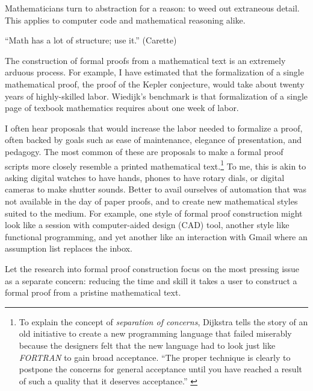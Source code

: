\documentclass{llncs}
\begin{document}
Mathematicians  turn to abstraction for a reason: to weed out
extraneous detail.  This applies to computer code and mathematical
reasoning alike.

``Math has a lot of structure; use it.'' (Carette)


The construction of formal proofs from a mathematical text is an extremely
arduous process.  For example, I have estimated that the formalization of a single
mathematical proof, the proof of the Kepler conjecture, would take about twenty
years of highly-skilled labor.  Wiedijk's benchmark is that formalization
of a single page of texbook mathematics requires about one week of labor.

I often hear proposals that would increase the labor needed to
formalize a proof, often backed by goals such as ease of maintenance,
elegance of presentation, and pedagogy.  The most common of these are
proposals to make a formal proof scripts more closely resemble a
printed mathematical text.\footnote{To explain the concept of {\it
    separation of concerns}, Dijkstra tells the story of an old
  initiative to create a new programming language that failed
  miserably because the designers felt that the new language had to
  look just like {\it FORTRAN} to gain broad acceptance. ``The proper
  technique is clearly to postpone the concerns for general acceptance
  until you have reached a result of such a quality that it deserves
  acceptance.'' \cite{XX}} %
 To me, this is
akin to asking digital watches to have hands, phones to have rotary
dials, or digital cameras to make shutter sounds.  Better to avail
ourselves of automation that was not available in the day of paper
proofs, and to create new mathematical styles suited to the medium.
For example, one style of formal proof construction might look like a
session with computer-aided design (CAD) tool, another style like
functional programming, and yet another like an interaction with Gmail
where an assumption list replaces the inbox.


Let the research into formal proof construction focus on the most
pressing issue as a separate concern: reducing the time and skill it
takes a user to construct a formal proof from a pristine mathematical
text.
\end{document}
